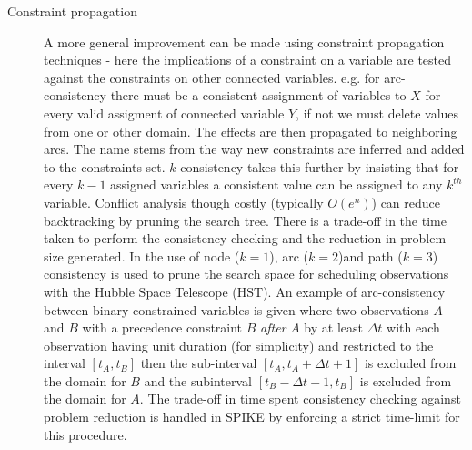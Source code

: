 \begin{description}
\item[Constraint propagation]
A more general improvement can be made using constraint propagation techniques - here the implications of a constraint on a variable are tested against the constraints on other connected variables. e.g. for arc-consistency there must be a consistent assignment of variables to $X$ for every valid assigment of connected variable $Y$, if not we must delete values from one or other domain. The effects are then propagated to neighboring arcs. The name stems from the way new constraints are inferred and added to the constraints set. $k$-consistency takes this further by insisting that for every $k-1$ assigned variables a consistent value can be assigned to any $k^{th}$ variable. Conflict analysis though costly (typically $O(e^n)$) \cite{muscORpoliORsadeh} can reduce backtracking by pruning the search tree. There is a trade-off in the time taken to perform the consistency checking and the reduction in problem size generated. In \cite{johnston94spike} the use of node ($k=1$), arc ($k=2$)and path ($k=3$) consistency is used to prune the search space for scheduling observations with the Hubble Space Telescope (HST). An example of arc-consistency between binary-constrained variables is given where two observations $A$ and $B$ with a precedence constraint $B$ \emph{after} $A$ by at least $\Delta t$ with each observation having unit duration (for simplicity) and restricted to the interval $[t_A,t_B]$ then the sub-interval $[t_A,t_A+ \Delta t+1]$ is excluded from the domain for $B$ and the subinterval $[t_B-\Delta t-1,t_B]$ is excluded from the domain for $A$. The trade-off in time spent consistency checking against problem reduction is handled in SPIKE by enforcing a strict time-limit for this procedure.


\end{description}
